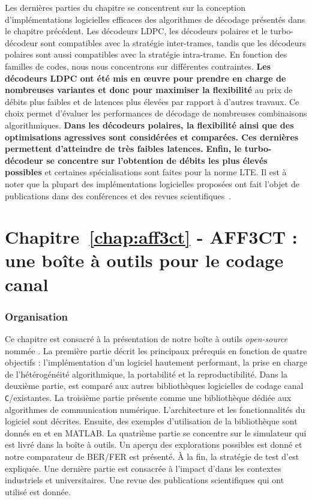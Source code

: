 Les dernières parties du chapitre se concentrent sur la conception
d'implémentations logicielles efficaces des algorithmes de décodage présentés
dans le chapitre précédent. Les décodeurs LDPC, les décodeurs polaires et le
turbo-décodeur sont compatibles avec la stratégie inter-trames, tandis que les
décodeurs polaires sont aussi compatibles avec la stratégie intra-trame. En
fonction des familles de codes, nous nous concentrons sur différentes
contraintes. \textbf{Les décodeurs LDPC ont été mis en œuvre pour prendre en
charge de nombreuses variantes et donc pour maximiser la flexibilité} au prix de
débits plus faibles et de latences plus élevées par rapport à d'autres travaux.
Ce choix permet d'évaluer les performances de décodage de nombreuses
combinaisons algorithmiques. \textbf{Dans les décodeurs polaires, la flexibilité
ainsi que des optimisations agressives sont considérées et comparées. Ces
dernières permettent d'atteindre de très faibles latences.} \textbf{Enfin, le
turbo-décodeur se concentre sur l'obtention de débits les plus élevés possibles}
et certaines spécialisations sont faites pour la norme LTE. Il est à noter que
la plupart des implémentations logicielles proposées ont fait l'objet de
publications dans des conférences et des revues
scientifiques~\cite{Ghaffari2019,Leonardon2019,Cassagne2015c,Cassagne2016b,
Cassagne2016a}.

\section*{Chapitre~\ref{chap:aff3ct} - AFF3CT : une boîte à outils pour le codage canal}

\subsubsection*{Organisation}

Ce chapitre est consacré à la présentation de notre boîte à outils
\emph{open-source} nommée \AFFECT. La première partie décrit les principaux
prérequis en fonction de quatre objectifs : l'implémentation d'un logiciel
hautement performant, la prise en charge de l'hétérogénéité algorithmique, la
portabilité et la reproductibilité. Dans la deuxième partie, \AFFECT est comparé
aux autres bibliothèques logicielles de codage canal \verb|C|/\Cxx existantes.
La troisième partie présente \AFFECT comme une bibliothèque dédiée aux
algorithmes de communication numérique. L'architecture et les fonctionnalités du
logiciel sont décrites. Ensuite, des exemples d'utilisation de la bibliothèque
sont donnés en \Cxx et en MATLAB\R. La quatrième partie se concentre sur le
simulateur \AFFECT qui est livré dans la boîte à outils. Un aperçu des
explorations possibles est donné et notre comparateur de BER/FER est présenté. À
la fin, la stratégie de test d'\AFFECT est expliquée. Une dernière partie est
consacrée à l'impact d'\AFFECT dans les contextes industriels et universitaires.
Une revue des publications scientifiques qui ont utilisé \AFFECT est donnée.

